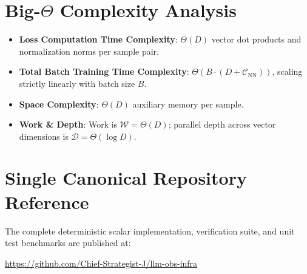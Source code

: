 \documentclass[11pt,a4paper]{article}
\theoremstyle{definition}
\begin{document}
\section{Big-$\Theta$ Complexity Analysis}

\begin{itemize}
    \item \textbf{Loss Computation Time Complexity}: $\Theta(D)$ vector dot products and normalization norms per sample pair.
    \item \textbf{Total Batch Training Time Complexity}: $\Theta(B \cdot (D + \mathcal{C}_{\text{NN}}))$, scaling strictly linearly with batch size $B$.
    \item \textbf{Space Complexity}: $\Theta(D)$ auxiliary memory per sample.
    \item \textbf{Work \& Depth}: Work is $\mathcal{W} = \Theta(D)$; parallel depth across vector dimensions is $\mathcal{D} = \Theta(\log D)$.
\end{itemize}

\section{Single Canonical Repository Reference}

The complete deterministic scalar implementation, verification suite, and unit test benchmarks are published at:
\begin{center}
\url{https://github.com/Chief-Strategist-J/llm-obs-infra}
\end{center}
\end{document}
